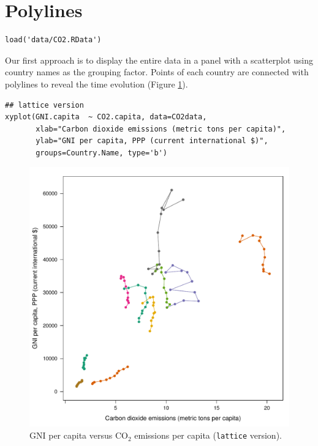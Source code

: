 
\section{Polylines}
\label{sec:org642cdb8}
\lstset{language=r,label= ,caption= ,captionpos=b,numbers=none}
\begin{lstlisting}
load('data/CO2.RData')
\end{lstlisting}


Our first approach is to display the entire data in a panel with a
scatterplot using country names as the grouping factor. Points of each
country are connected with polylines to reveal the time evolution
(Figure \ref{fig:CO2-GNI}).
\lstset{language=r,label= ,caption= ,captionpos=b,numbers=none}
\begin{lstlisting}
## lattice version
xyplot(GNI.capita  ~ CO2.capita, data=CO2data,
       xlab="Carbon dioxide emissions (metric tons per capita)",
       ylab="GNI per capita, PPP (current international $)",
       groups=Country.Name, type='b')
\end{lstlisting}

\begin{figure}[htbp]
\centering
\includegraphics[width=.9\linewidth]{figs/CO2_GNI.pdf}
\caption{GNI per capita versus \(\mathrm{CO_2}\) emissions per capita (\texttt{lattice} version). \label{fig:CO2-GNI}}
\end{figure}

